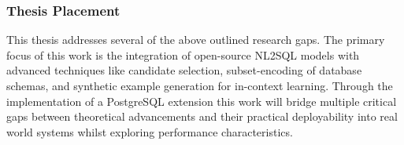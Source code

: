 \subsubsection{Thesis Placement}

This thesis addresses several of the above outlined research gaps. The primary focus of this work is the integration of open-source
NL2SQL models with advanced techniques like candidate selection, subset-encoding of database schemas, and synthetic example 
generation for in-context learning. Through the implementation of a PostgreSQL extension this work will bridge multiple critical 
gaps between theoretical advancements and their practical deployability into real world systems whilst exploring performance 
characteristics.
